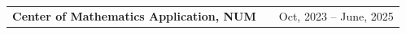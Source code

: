 \documentclass[a4paper,11pt]{article}
\makeatletter
\newcommand{\linkicon}{{\footnotesize\faExternalLink*}}
\newenvironment{jobshort}[2]
    {
    \begin{tabularx}{\linewidth}{@{}l X r@{}}
    \textbf{#1} & \hfill &  #2 \\[3.75pt]
    \end{tabularx}
    }
    {
    }
\makeatother
\begin{document}
\begin{jobshort}{Center of Mathematics Application, NUM}{Oct, 2023 -- June, 2025}
\begin{itemize}[nosep,after=\strut,leftmargin=1em,itemsep=3pt,label=--]


    

    
    
    


\end{itemize}
\end{jobshort}
\end{document}
